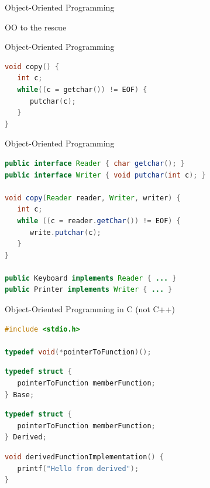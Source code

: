 
\begin{frame}{Object-Oriented Programming}
\begin{center}
OO to the rescue
\end{center}
\end{frame}

\begin{frame}[fragile]{Object-Oriented Programming}
\begin{lstlisting}[language=c]
void copy() {
   int c;
   while((c = getchar()) != EOF) {
      putchar(c);
   }
}
\end{lstlisting}
\end{frame}


\begin{frame}[fragile]{Object-Oriented Programming}
\begin{lstlisting}[language=java]
public interface Reader { char getchar(); }
public interface Writer { void putchar(int c); }

void copy(Reader reader, Writer, writer) {
   int c;
   while ((c = reader.getChar()) != EOF) {
      write.putchar(c);
   }
}

public Keyboard implements Reader { ... }
public Printer implements Writer { ... }
\end{lstlisting}
\end{frame}

\begin{frame}[fragile]{Object-Oriented Programming in C (not C++)}
\begin{lstlisting}[language=c]
#include <stdio.h>

typedef void(*pointerToFunction)();
\end{lstlisting}
\pause
\begin{lstlisting}[language=c]
typedef struct {
   pointerToFunction memberFunction;
} Base;
\end{lstlisting}
\pause
\begin{lstlisting}[language=c]
typedef struct {
   pointerToFunction memberFunction;
} Derived;
\end{lstlisting}
\pause
\begin{lstlisting}[language=c]
void derivedFunctionImplementation() {
   printf("Hello from derived");
}
\end{lstlisting}
\end{frame}


